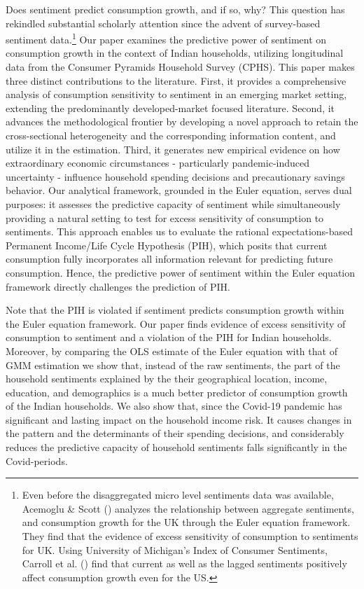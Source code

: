 \documentclass[
  abstract]{scrartcl}
\begin{document}
Does sentiment predict consumption growth, and if so, why? This question
has rekindled substantial scholarly attention since the advent of
survey-based sentiment data.\footnote{Even before the disaggregated
  micro level sentiments data was available, Acemoglu \& Scott
  () analyzes the relationship between
  aggregate sentiments, and consumption growth for the UK through the
  Euler equation framework. They find that the evidence of excess
  sensitivity of consumption to sentiments for UK. Using University of
  Michigan's Index of Consumer Sentiments, Carroll et al.
  () find that current as well as
  the lagged sentiments positively affect consumption growth even for
  the US.} Our paper examines the predictive power of sentiment on
consumption growth in the context of Indian households, utilizing
longitudinal data from the Consumer Pyramids Household Survey (CPHS).
This paper makes three distinct contributions to the literature. First,
it provides a comprehensive analysis of consumption sensitivity to
sentiment in an emerging market setting, extending the predominantly
developed-market focused literature. Second, it advances the
methodological frontier by developing a novel approach to retain the
cross-sectional heterogeneity and the corresponding information content,
and utilize it in the estimation. Third, it generates new empirical
evidence on how extraordinary economic circumstances - particularly
pandemic-induced uncertainty - influence household spending decisions
and precautionary savings behavior. Our analytical framework, grounded
in the Euler equation, serves dual purposes: it assesses the predictive
capacity of sentiment while simultaneously providing a natural setting
to test for excess sensitivity of consumption to sentiments. This
approach enables us to evaluate the rational expectations-based
Permanent Income/Life Cycle Hypothesis (PIH), which posits that current
consumption fully incorporates all information relevant for predicting
future consumption. Hence, the predictive power of sentiment within the
Euler equation framework directly challenges the prediction of PIH.

Note that the PIH is violated if sentiment predicts consumption growth
within the Euler equation framework. Our paper finds evidence of excess
sensitivity of consumption to sentiment and a violation of the PIH for
Indian households. Moreover, by comparing the OLS estimate of the Euler
equation with that of GMM estimation we show that, instead of the raw
sentiments, the part of the household sentiments explained by the their
geographical location, income, education, and demographics is a much
better predictor of consumption growth of the Indian households. We also
show that, since the Covid-19 pandemic has significant and lasting
impact on the household income risk. It causes changes in the pattern
and the determinants of their spending decisions, and considerably
reduces the predictive capacity of household sentiments falls
significantly in the Covid-periods.
\end{document}
